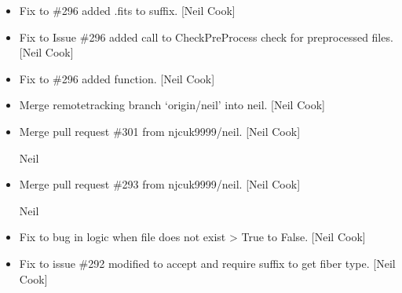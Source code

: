 \documentclass[a4paper,10pt,english]{report}
\begin{document}
\begin{itemize}
\item {} 
Fix to \#296 \sphinxhyphen{} added .fits to suffix. {[}Neil Cook{]}

\item {} 
Fix to Issue \#296 \sphinxhyphen{} added call to CheckPreProcess \sphinxhyphen{} check for
preprocessed files. {[}Neil Cook{]}

\item {} 
Fix to \#296 \sphinxhyphen{} added  function. {[}Neil Cook{]}

\item {} 
Merge remote\sphinxhyphen{}tracking branch ‘origin/neil’ into neil. {[}Neil Cook{]}

\item {} 
Merge pull request \#301 from njcuk9999/neil. {[}Neil Cook{]}

Neil

\item {} 
Merge pull request \#293 from njcuk9999/neil. {[}Neil Cook{]}

Neil

\item {} 
Fix to  \sphinxhyphen{} bug in logic when file does not exist \textendash{}\textgreater{} True to
False. {[}Neil Cook{]}

\item {} 
Fix to issue \#292 \sphinxhyphen{}  modified to accept and require
suffix to get fiber type. {[}Neil Cook{]}

\end{itemize}
\end{document}
